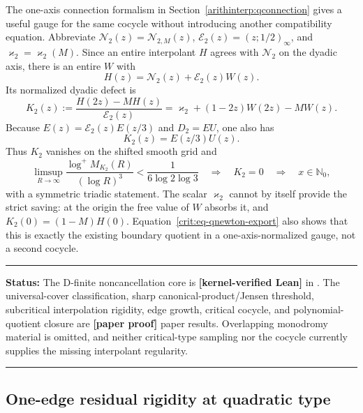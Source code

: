 \documentclass[11pt,oneside]{article}
\theoremstyle{definition}
\theoremstyle{remark}
\newcommand{\Nzero}{\mathbb N_0}
\newcommand{\lean}[1]{\texttt{\detokenize{#1}}}
\newcommand{\statuslean}{\textcolor{leanblue}{\textbf{[kernel-verified Lean]}}}
\newcommand{\statusnew}{\textcolor{newgreen}{\textbf{[paper proof]}}}
\newenvironment{statusbox}[1]
{\begin{center}\begin{minipage}{0.94\textwidth}\raggedright\hbadness=10000\hrule
\vspace{0.45em}\textbf{Status:} #1\par\vspace{0.35em}}
{\vspace{0.35em}\hrule\end{minipage}\end{center}}
\begin{document}
The one-axis connection formalism in Section~\ref{arithinterp:qconnection} gives a useful
gauge for the same cocycle without introducing another compatibility equation.  Abbreviate
$\mathcal N_2(z)=\mathcal N_{2,M}(z)$,
$\mathcal E_2(z)=(z;1/2)_\infty$, and $\varkappa_2=\varkappa_2(M)$.  Since an entire interpolant $H$ agrees with $\mathcal N_2$
on the dyadic axis, there is an entire $W$ with
\[
 H(z)=\mathcal N_2(z)+\mathcal E_2(z)W(z).
\]
Its normalized dyadic defect is
\begin{equation}
 K_2(z):=\frac{H(2z)-MH(z)}{\mathcal E_2(z)}
 =\varkappa_2+(1-2z)W(2z)-MW(z).
 \label{crit:eq-qnewton-gauge}
\end{equation}
Because $E(z)=\mathcal E_2(z)E(z/3)$ and $D_2=EU$, one also has
\begin{equation}
 K_2(z)=E(z/3)U(z).
 \label{crit:eq-qnewton-export}
\end{equation}
Thus $K_2$ vanishes on the shifted smooth grid and
\begin{equation}
 \limsup_{R\to\infty}\frac{\log^+M_{K_2}(R)}{(\log R)^3}
 <\frac1{6\log2\log3}
 \quad\Longrightarrow\quad K_2=0\quad\Longrightarrow\quad x\in\Nzero,
 \label{crit:eq-qnewton-gauge-closure}
\end{equation}
with a symmetric triadic statement.  The scalar $\varkappa_2$ cannot by itself provide the
strict saving: at the origin the free value of $W$ absorbs it, and
$K_2(0)=(1-M)H(0)$.  Equation~\eqref{crit:eq-qnewton-export} also shows that this is exactly
the existing boundary quotient in a one-axis-normalized gauge, not a second cocycle.

\begin{statusbox}{The D-finite noncancellation core is \statuslean{} in
\lean{DfiniteExponentCore}.  The universal-cover
classification, sharp canonical-product/Jensen threshold, subcritical interpolation
rigidity, edge growth, critical cocycle, and polynomial-quotient closure are \statusnew{}
paper results.  Overlapping monodromy material is omitted, and neither critical-type sampling
nor the cocycle currently supplies the missing interpolant regularity.}
\end{statusbox}

\subsection{One-edge residual rigidity at quadratic type}
\label{crit:edge-residual}
\end{document}
